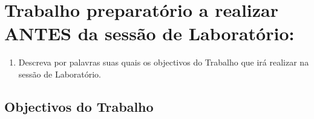 \documentclass[a4paper,12pt]{article}  %
\begin{document}
\section{\sf Trabalho preparatório a realizar  ANTES da sessão de Laboratório:}
\begin{enumerate}
\item Descreva por palavras suas quais os objectivos do Trabalho que irá realizar na sessão de Laboratório.

\end{enumerate}

\subsection{\sf Objectivos do Trabalho}
\noindent\underline{\makebox[\textwidth][r]{~}} \\
\noindent\underline{\makebox[\textwidth][r]{~}} \\
\noindent\underline{\makebox[\textwidth][r]{~}} \\
\noindent\underline{\makebox[\textwidth][r]{~}} \\
\noindent\underline{\makebox[\textwidth][r]{~}} \\
\noindent\underline{\makebox[\textwidth][r]{~}} \\
\noindent\underline{\makebox[\textwidth][r]{~}} \\
\end{document}
